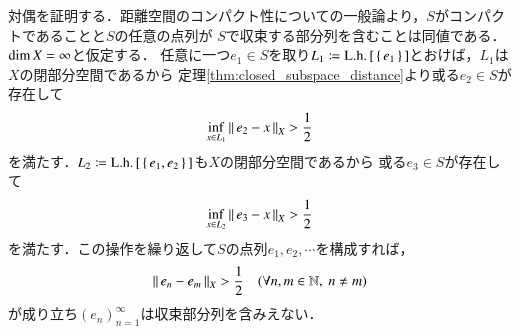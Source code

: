 	\begin{prf}
		対偶を証明する．距離空間のコンパクト性についての一般論より，$S$がコンパクトであることと$S$の任意の点列が
		$S$で収束する部分列を含むことは同値である．$\operatorname{dim} X = \infty$と仮定する．
		任意に一つ$e_1 \in S$を取り$L_1 \coloneqq \mathrm{L.h.}\left[\, \{\, e_1\, \}\, \right]$とおけば，$L_1$は$X$の閉部分空間であるから
		定理\ref{thm:closed_subspace_distance}より或る$e_2 \in S$が存在して
		\begin{align}
			\operatorname*{inf}_{x \in L_1} \left\|\, e_2 - x\, \right\|_{X} > \frac{1}{2}
		\end{align}
		を満たす．$L_2 \coloneqq \mathrm{L.h.}\left[\, \{\, e_1,e_2\, \}\, \right]$も$X$の閉部分空間であるから
		或る$e_3 \in S$が存在して
		\begin{align}
			\operatorname*{inf}_{x \in L_2} \left\|\, e_3 - x\, \right\|_{X} > \frac{1}{2}
		\end{align}
		を満たす．この操作を繰り返して$S$の点列$e_1,e_2,\cdots$を構成すれば，
		\begin{align}
			\left\|\, e_n - e_m\, \right\|_{X} > \frac{1}{2} \quad (\forall n,m \in \mathbb{N},\ n \neq m)
		\end{align}
		が成り立ち$\left( e_n \right)_{n=1}^{\infty}$は収束部分列を含みえない．
		\QED
	\end{prf}